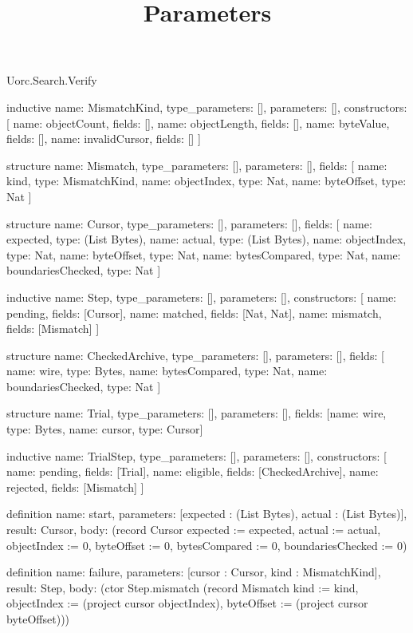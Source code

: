 \begin{lexlean}{Uorc.Search.Verify}
\title{Parameters}
\begin{semanticmodule}
inductive{
  name: MismatchKind,
  type_parameters: [],
  parameters: [],
  constructors: [
    {name: objectCount, fields: []},
    {name: objectLength, fields: []},
    {name: byteValue, fields: []},
    {name: invalidCursor, fields: []}
  ]
}

structure{
  name: Mismatch,
  type_parameters: [],
  parameters: [],
  fields: [
    {name: kind, type: MismatchKind},
    {name: objectIndex, type: Nat},
    {name: byteOffset, type: Nat}
  ]
}

structure{
  name: Cursor,
  type_parameters: [],
  parameters: [],
  fields: [
    {name: expected, type: (List Bytes)},
    {name: actual, type: (List Bytes)},
    {name: objectIndex, type: Nat},
    {name: byteOffset, type: Nat},
    {name: bytesCompared, type: Nat},
    {name: boundariesChecked, type: Nat}
  ]
}

inductive{
  name: Step,
  type_parameters: [],
  parameters: [],
  constructors: [
    {name: pending, fields: [Cursor]},
    {name: matched, fields: [Nat, Nat]},
    {name: mismatch, fields: [Mismatch]}
  ]
}

structure{
  name: CheckedArchive,
  type_parameters: [],
  parameters: [],
  fields: [
    {name: wire, type: Bytes},
    {name: bytesCompared, type: Nat},
    {name: boundariesChecked, type: Nat}
  ]
}

structure{
  name: Trial,
  type_parameters: [],
  parameters: [],
  fields: [{name: wire, type: Bytes}, {name: cursor, type: Cursor}]
}

inductive{
  name: TrialStep,
  type_parameters: [],
  parameters: [],
  constructors: [
    {name: pending, fields: [Trial]},
    {name: eligible, fields: [CheckedArchive]},
    {name: rejected, fields: [Mismatch]}
  ]
}

definition{
  name: start,
  parameters: [expected : (List Bytes), actual : (List Bytes)],
  result: Cursor,
  body: (record Cursor {expected := expected, actual := actual, objectIndex := 0, byteOffset := 0, bytesCompared := 0, boundariesChecked := 0})
}

definition{
  name: failure,
  parameters: [cursor : Cursor, kind : MismatchKind],
  result: Step,
  body: (ctor Step.mismatch (record Mismatch {kind := kind, objectIndex := (project cursor objectIndex), byteOffset := (project cursor byteOffset)}))
}


\end{semanticmodule}
\end{lexlean}
